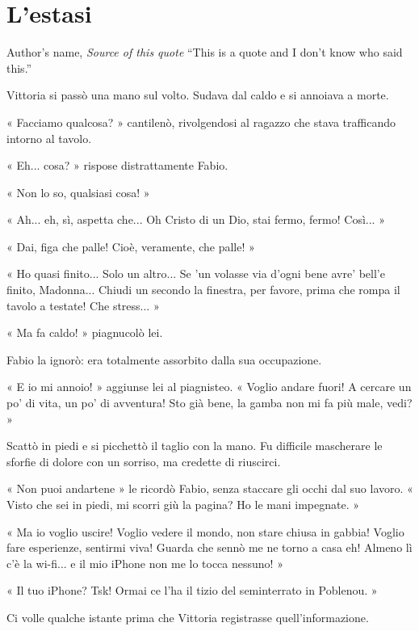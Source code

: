 \chapter{L'estasi}

\begin{chapquote}{Author's name, \textit{Source of this quote}}
``This is a quote and I don't know who said this.''
\end{chapquote}


Vittoria si passò una mano sul volto. Sudava dal caldo e si annoiava a morte.

« Facciamo qualcosa? » cantilenò, rivolgendosi al ragazzo che stava trafficando intorno al tavolo.

« Eh... cosa? » rispose distrattamente Fabio.

« Non lo so, qualsiasi cosa! »

« Ah... eh, sì, aspetta che... Oh Cristo di un Dio, stai fermo, fermo! Così... »

« Dai, figa che palle! Cioè, veramente, che palle! »

« Ho quasi finito... Solo un altro... Se 'un volasse via d'ogni bene avre' bell'e finito, Madonna... Chiudi un secondo la finestra, per favore, prima che rompa il tavolo a testate! Che stress... »

« Ma fa caldo! » piagnucolò lei.

Fabio la ignorò: era totalmente assorbito dalla sua occupazione.

« E io mi annoio! » aggiunse lei al piagnisteo. « Voglio andare fuori! A cercare un po' di vita, un po' di avventura! Sto già bene, la gamba non mi fa più male, vedi? »

Scattò in piedi e si picchettò il taglio con la mano. Fu difficile mascherare le sforfie di dolore con un sorriso, ma credette di riuscirci.

« Non puoi andartene » le ricordò Fabio, senza staccare gli occhi dal suo lavoro. « Visto che sei in piedi, mi scorri giù la pagina? Ho le mani impegnate. »

« Ma io voglio uscire! Voglio vedere il mondo, non stare chiusa in gabbia! Voglio fare esperienze, sentirmi viva! Guarda che sennò me ne torno a casa eh! Almeno lì c'è la wi-fi... e il mio iPhone non me lo tocca nessuno! »

« Il tuo iPhone? Tsk! Ormai ce l'ha il tizio del seminterrato in Poblenou. »

Ci volle qualche istante prima che Vittoria registrasse quell'informazione.

